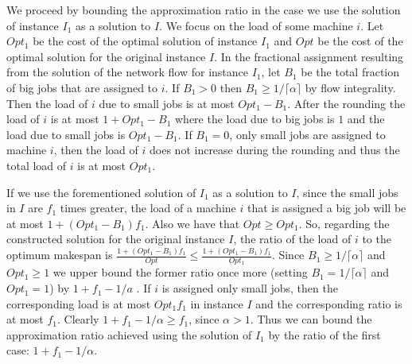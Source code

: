 \documentclass[11pt]{article}\usepackage{amsmath}
\begin{document}
We proceed by bounding the approximation ratio in the case we use the solution of instance $I_1$ as a solution to $I$. We focus on the load of some machine $i$. Let $Opt_1$ be the  cost of the optimal solution of instance $I_1$ and $Opt$ be the cost of the optimal solution for the original instance $I$. In the fractional assignment resulting from the solution of the network flow for instance $I_1$, let $B_1$ be the total fraction of big jobs that are assigned to $i$. If $B_1 > 0$ then $B_1 \geq 1/\lceil \alpha  \rceil$ by flow integrality. Then the load of $i$ due to small jobs is at most $Opt_1 - B_1$. After the rounding the load of $i$ is at most $1+Opt_1-B_1$ where the load due to big jobs is $1$ and the load due to small jobs is $Opt_1-B_1$. If $B_1=0$, only small jobs are assigned to machine $i$, then the load of $i$ does not increase during the rounding and thus the total load of $i$ is at most $Opt_1$.


If we use the forementioned solution of $I_1$ as a solution to $I$, since the small
jobs in $I$ are $f_1$ times greater, the load of a machine $i$ that is assigned a big job 
will be  at most
$1+(Opt_1-B_1) f_1$.  Also we have that $Opt \geq Opt_1$. So, regarding the constructed solution for the original instance $I$, the ratio of the load of $i$ to the optimum makespan is $\frac{1+(Opt_1-B_1) f_1}{Opt} \leq \frac{1+(Opt_1-B_1) f_1}{Opt_1}$. Since $B_1 \geq 1/\lceil \alpha  \rceil $ and $Opt_1 \geq 1$ we upper bound the former ratio once more (setting $B_1 =1/\lceil \alpha  \rceil $ and $Opt_1 = 1$) by $1+f_1-1/a$ . If $i$ is assigned only small jobs, then the corresponding load is at most $Opt_1f_1$ in instance $I$ and the corresponding ratio is at most $f_1$. Clearly $1+f_1-1/\alpha \ge f_1$, since $\alpha >1$. Thus we can bound the approximation ratio achieved using the solution of $I_1$ by the ratio of the first case: $1+f_1-1/\alpha$.
\end{document}

